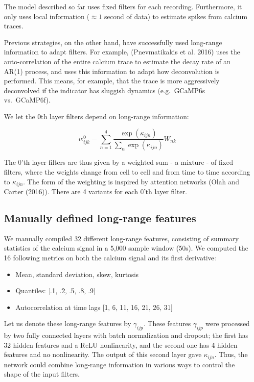 \documentclass[]{article}
\providecommand{\tightlist}{%
  \setlength{\itemsep}{0pt}\setlength{\parskip}{0pt}}
\begin{document}
The model described so far uses fixed filters for each recording.
Furthermore, it only uses local information (\(\approx 1\) second of
data) to estimate spikes from calcium traces.

Previous strategies, on the other hand, have successfully used
long-range information to adapt filters. For example, (Pnevmatikakis et
al. 2016) uses the auto-correlation of the entire calcium trace to
estimate the decay rate of an AR(1) process, and uses this information
to adapt how deconvolution is performed. This means, for example, that
the trace is more aggressively deconvolved if the indicator has sluggish
dynamics (e.g.~GCaMP6s vs.~GCaMP6f).

We let the \(0\)th layer filters depend on long-range information:

\[w^0_{ijk} = \sum_{n=1}^4 \frac{\exp(\kappa_{ijn})}{\sum_n \exp(\kappa_{ijn})} W_{nk}\]

The 0'th layer filters are thus given by a weighted sum - a mixture - of
fixed filters, where the weights change from cell to cell and from time
to time according to \(\kappa_{ijn}\). The form of the weighting is
inspired by attention networks (Olah and Carter (2016)). There are 4
variants for each 0'th layer filter.

\subsection{Manually defined long-range
features}\label{manually-defined-long-range-features}

We manually compiled 32 different long-range features, consisting of
summary statistics of the calcium signal in a 5,000 sample window (50s).
We computed the 16 following metrics on both the calcium signal and its
first derivative:

\begin{itemize}
\tightlist
\item
  Mean, standard deviation, skew, kurtosis
\item
  Quantiles: {[}.1, .2, .5, .8, .9{]}
\item
  Autocorrelation at time lags {[}1, 6, 11, 16, 21, 26, 31{]}
\end{itemize}

Let us denote these long-range features by \(\gamma_{ijp}\). These
features \(\gamma_{ijp}\) were processed by two fully connected layers
with batch normalization and dropout; the first has 32 hidden features
and a ReLU nonlinearity, and the second one has 4 hidden features and no
nonlinearity. The output of this second layer gave \(\kappa_{ijn}\).
Thus, the network could combine long-range information in various ways
to control the shape of the input filters.
\end{document}
